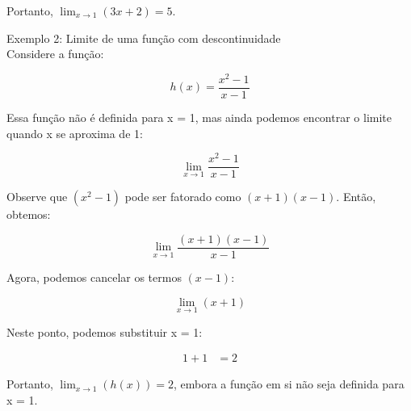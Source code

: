 \documentclass[Analysis/analysis_notes.tex]{subfiles}
\begin{document}
\begin{enumerate}
	      Portanto, $\lim_{x \to 1} (3x + 2) = 5$.

	      \begin{center}
	      \end{center}

	      Exemplo 2: Limite de uma função com descontinuidade \\
	      Considere a função:

	      \begin{equation*}
		      h(x) = \frac{x^2 - 1}{x - 1}
	      \end{equation*}

	      Essa função não é definida para x = 1, mas ainda podemos encontrar o limite quando x se aproxima de 1:

	      \begin{equation*}
		      \lim_{x \to 1} \frac{x^2 - 1}{x - 1}
	      \end{equation*}

	      Observe que $(x^2 - 1)$ pode ser fatorado como $(x + 1)(x - 1)$. Então, obtemos:

	      \begin{equation*}
		      \lim_{x \to 1} \frac{(x + 1)(x - 1)}{x - 1}
	      \end{equation*}

	      Agora, podemos cancelar os termos $(x - 1)$:

	      \begin{equation*}
		      \lim_{x \to 1} (x + 1)
	      \end{equation*}

	      Neste ponto, podemos substituir x = 1:

	      \begin{align*}
		      1 + 1 & = 2
	      \end{align*}

	      Portanto, $\lim_{x \to 1} (h(x)) = 2$, embora a função em si não seja definida para x = 1.

	      \begin{center}
	      \end{center}
\end{enumerate}
\end{document}
